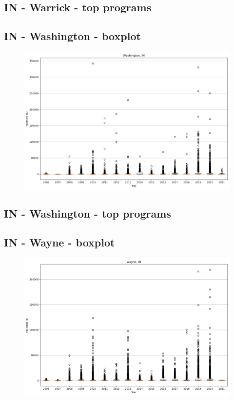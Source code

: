 \subsection*{IN - Warrick - top programs}

\newpage
\subsection*{IN - Washington - boxplot}
\begin{figure}[h]
\centering
\includegraphics[width=7in]{../output/boxplots/counties/Washington-IN_boxplot.png}
\end{figure}


\subsection*{IN - Washington - top programs}

\newpage
\subsection*{IN - Wayne - boxplot}
\begin{figure}[h]
\centering
\includegraphics[width=7in]{../output/boxplots/counties/Wayne-IN_boxplot.png}
\end{figure}


